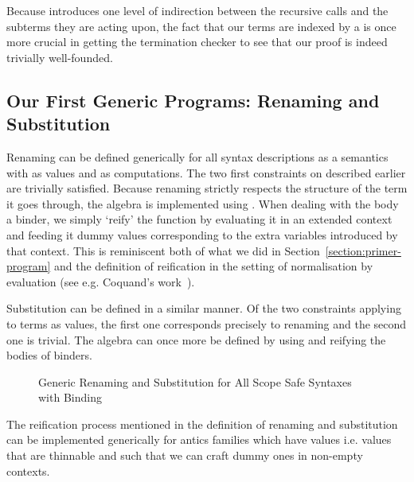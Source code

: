 Because  introduces one level of indirection between the
recursive calls and the subterms they are acting upon, the fact
that our terms are indexed by a  is once more crucial in
getting the termination checker to see that our proof is indeed
trivially well-founded.

\subsection{Our First Generic Programs: Renaming and Substitution}

Renaming can be defined generically for all syntax descriptions as a
semantics with  as values and  as computations. The
two first constraints on  described earlier are trivially
satisfied. Because renaming strictly respects the structure of the
term it goes through, the algebra is implemented using .
When dealing with the body a binder, we simply `reify' the
 function by evaluating it in an extended context and
feeding it dummy values corresponding to the extra variables
introduced by that context. This is reminiscent both of what we
did in Section~\ref{section:primer-program} and the definition
of reification in the setting of normalisation by evaluation
(see e.g. Coquand's work~\citeyear{coquand2002formalised}).

Substitution can be defined in a similar manner. Of the two
constraints applying to terms as values, the first one corresponds
precisely to renaming and the second one is trivial. The algebra
can once more be defined by using  and reifying the bodies
of binders.

\begin{figure}[h]
\begin{minipage}{0.45\textwidth}
\end{minipage}\hspace{2em}
\begin{minipage}{0.45\textwidth}
\end{minipage}
\caption{Generic Renaming and Substitution for All Scope Safe Syntaxes with Binding}
\end{figure}

The reification process mentioned in the definition of renaming
and substitution can be implemented generically for antics
families which have  values i.e. values that are thinnable
and such that we can craft dummy ones in non-empty contexts.

